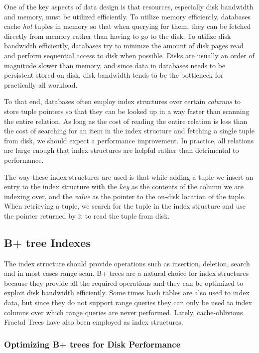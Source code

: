 \documentclass{article}
\begin{document}
One of the key aspects of data design is that resources, especially disk bandwidth and memory, must be utilized efficiently. To utilize memory efficiently, databases cache \textit{hot} tuples in memory so that when querying for them, they can be fetched directly from memory rather than having to go to the disk. To utilize disk bandwidth efficiently, databases try to minimze the amount of disk pages read and perform sequential access to disk when possible. Disks are usually an order of magnitude slower than memory, and since data in databases needs to be persistent stored on disk, disk bandwidth tends to be the bottleneck for practically all workload.

To that end, databases often employ index structures over certain \textit{columns} to store tuple pointers so that they can be looked up in a way faster than scanning the entire relation. As long as the cost of reading the entire relation is less than the cost of searching for an item in the index structure and fetching a single tuple from disk, we should expect a performance improvement. In practice, all relations are large enough that index structures are helpful rather than detrimental to performance.

The way these index structures are used is that while adding a tuple we insert an entry to the index structure with the \textit{key} as the contents of the column we are indexing over, and the \textit{value} as the pointer to the on-disk location of the tuple. When retrieving a tuple, we search for the tuple in the index structure and use the pointer returned by it to read the tuple from disk. 

\subsection{B+ tree Indexes}
The index structure should provide operations such as insertion, deletion, search and in most cases range scan. B+ trees are a natural choice for index structures because they provide all the required operations and they can be optimized to exploit disk bandwidth efficiently. Some times hash tables are also used to index data, but since they do not support range queries they can only be used to index columns over which range queries are never performed. Lately, cache-oblivious Fractal Trees have also been employed as index structures.


\subsubsection{Optimizing B+ trees for Disk Performance}
\end{document}
